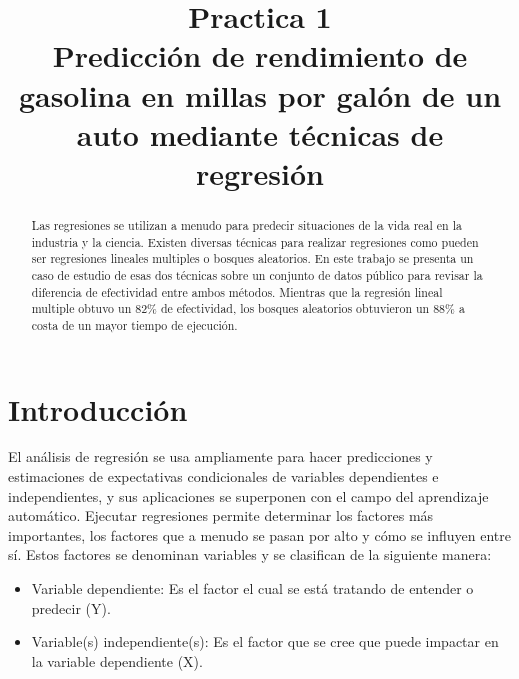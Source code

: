 \documentclass[conference]{IEEEtran}
\begin{document}
\title{Practica 1 \\ Predicción de rendimiento de gasolina en millas por galón de un auto mediante técnicas de regresión}

\author{
}

\maketitle

\begin{abstract}
Las regresiones se utilizan a menudo para predecir situaciones de la vida real en la industria y la ciencia. Existen diversas técnicas para realizar regresiones como pueden ser regresiones lineales multiples o bosques aleatorios. En este trabajo se presenta un caso de estudio de esas dos técnicas sobre un conjunto de datos público para revisar la diferencia de efectividad entre ambos métodos. Mientras que la regresión lineal multiple obtuvo un 82\% de efectividad, los bosques aleatorios obtuvieron un 88\% a costa de un mayor tiempo de ejecución.  
\end{abstract}

\section{Introducción}

El análisis de regresión se usa ampliamente para hacer predicciones y estimaciones de expectativas condicionales de variables dependientes e independientes, y sus aplicaciones se superponen con el campo del aprendizaje automático. Ejecutar regresiones permite determinar los factores más importantes, los factores que a menudo se pasan por alto y cómo se influyen entre sí. Estos factores se denominan variables y se clasifican de la siguiente manera: \\

\begin{itemize}
\item Variable dependiente: Es el factor el cual se está tratando de entender o predecir (Y).
\item Variable(s) independiente(s): Es el factor que se cree que puede impactar en la variable dependiente (X). \\
\end{itemize}
\end{document}
